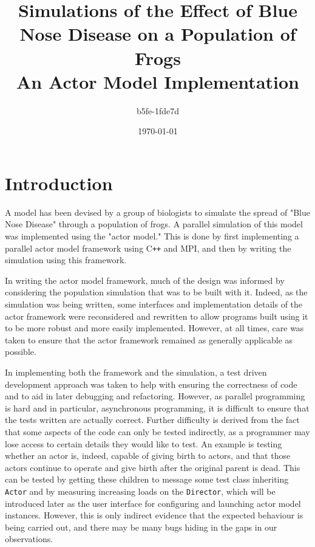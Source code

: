 \documentclass[12pt,a4paper]{article}
\newcommand{\term}[1]{\texttt{#1}}
\begin{document}
\title{
    Simulations of the Effect of Blue Nose Disease on a Population of Frogs\\
    \Large{An Actor Model Implementation}
}
\author{b5fe-1fde7d}
\date{\today}

\makeEPCCtitle

\thispagestyle{empty}

\newpage


\tableofcontents

\newpage
{}


\section{Introduction}
A model has been devised by a group of biologists to simulate the
spread of "Blue Nose Disease" through a population of frogs.
A parallel simulation of this model was implemented
using the "actor model."
This is done by first implementing a parallel actor model framework
using C\verb!++! and MPI, and then by writing the simulation
using this framework.

In writing the actor model framework, much of the design was informed
by considering the population simulation that was to be built with it.
Indeed, as the simulation was being written, some interfaces
and implementation details of the actor framework were reconsidered
and rewritten to allow programs built using it to be
more robust and more easily implemented.
However, at all times, care was taken to ensure that the actor framework
remained as generally applicable as possible.

In implementing both the framework and the simulation,
a test driven development approach was taken to help with ensuring
the correctness of code and to aid in later debugging and refactoring.
However, as parallel programming is hard and in particular,
asynchronous programming, it is difficult to ensure that the tests
written are actually correct.
Further difficulty is derived from the fact that some aspects of the code
can only be tested indirectly, as a programmer may lose access to certain
details they would like to test.
An example is testing whether an actor is, indeed, capable of giving
birth to actors, and that those actors continue to operate
and give birth after the original parent is dead.
This can be tested by getting these children to message some test
class inheriting \term{Actor} and
by measuring increasing loads on the \term{Director},
which will be introduced later as the user interface for
configuring and launching actor model instances.
However, this is only indirect evidence that the expected behaviour
is being carried out, and there may be many bugs hiding in the gaps
in our observations.
\end{document}
